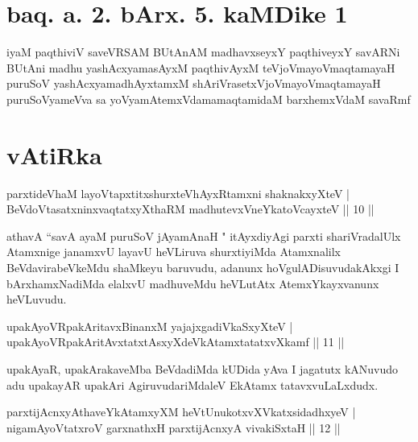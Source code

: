 \section*{baq. a. 2. bArx. 5. kaMDike 1}

\begin{shl}
iyaM paqthiviV saveVRSAM BUtAnAM madhavxseyxY paqthiveyxY savARNi BUtAni madhu yashAcxyamasAyxM paqthivAyxM teVjoVmayoV\s maqtamayaH puruSoV yashAcxyamadhAyxtamxM shAriVrasetxVjoVmayoV\s maqtamayaH puruSoV\s yameVva sa yoV\s yamAtemxVdamamaqtamidaM barxhemxVdaM savaRmf 
\end{shl}


\section*{vAtiRka}

\begin{shl}
parxtideVhaM layoVtapxtitxshurxteVhAyxRtamxni shaknakxyXteV |\\
BeVdoV\s tasatxninxvaqtatxyXthaRM madhutevxVneYkatoVcayxteV \hfill || 10 ||
\end{shl}

\begin{artha}
athavA ``savA ayaM puruSoV jAyamAnaH " itAyxdiyAgi parxti shariVra\-dalUlx Atamxnige janamxvU layavU heVLiruva shurxtiyiMda Atamxnalilx BeVdavirabeVkeMdu shaMkeyu baruvudu, adanunx hoVgulADisuvudakAkxgi I bArxhamxNadiMda elalxvU madhuveMdu heVLutAtx AtemxYkayxvanunx heVLuvudu.
\end{artha}


\begin{shl}
upakAyoVRpakAritavxBinanxM yajajxgadiVkaSxyXteV |\\
upakAyoVRpakAritAvxtatxtAsxyXdeVkAtamxtatatxvXkamf \hfill || 11 ||
\end{shl}

\begin{artha}
upakAyaR, upakArakaveMba BeVdadiMda kUDida yAva I jagatutx kANuvudo adu upakayAR upakAri AgiruvudariMdaleV EkAtamx tatavxvuLaLxdudx.
\end{artha}


\begin{shl}
parxtijAcnxyAthaveYkAtamxyXM heVtUnukotxvXVkatxsidadhxyeV |\\
nigamAyoVtatxroV garxnathxH parxtijAcnxyA vivakiSxtaH \hfill || 12 ||
\end{shl}


